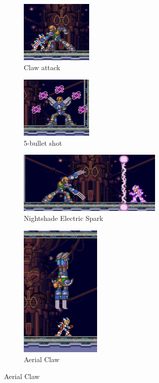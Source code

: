 \begin{figure}[htp]
	\centering
	\begin{minipage}{.64\linewidth}		
		\begin{subfigure}{.49\linewidth}
			\centering
			\includegraphics[height=3cm]{figures/X2/Hunter_stages/Sigma_claw.png}
			\caption{Claw attack}	
		\end{subfigure}
		\begin{subfigure}{.49\linewidth}
			\centering
			\includegraphics[height=3cm]{figures/X2/Hunter_stages/Sigma_spark.png}
			\caption{5-bullet shot}
		\end{subfigure}
			\begin{subfigure}{\linewidth}
			\centering
			\includegraphics[height=3cm]{figures/X2/Hunter_stages/Sigma_electric_wall.png}
			\caption{Nightshade Electric Spark}
		\end{subfigure}
	\end{minipage}
	\begin{minipage}{0.35\linewidth}		
		\begin{subfigure}{\linewidth}
			\centering
			\includegraphics[height=6.5cm]{figures/X2/Hunter_stages/Sigma_dive.png}
			\caption{Aerial Claw}
		\end{subfigure}
	\end{minipage}	
\end{figure}

